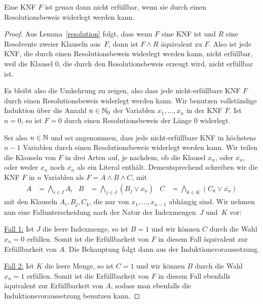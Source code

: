 \begin{thm}
	Eine KNF $F$ ist genau dann nicht erfüllbar, wenn sie durch einen Resolutionsbeweis widerlegt werden kann. 
\end{thm} 
\begin{proof}
	Aus Lemma~\ref{resolution} folgt, dass wenn $F$ eine KNF ist und $R$ eine Resolvente zweier Klauseln aus~$F$, dann ist $F \wedge R$ äquivalent zu $F$. Also ist jede KNF, die durch einen Resolutionsbeweis widerlegt werden kann, nicht erfüllbar, weil die Klausel $0$, die durch den Resolutionsbeweis erzeugt wird, nicht erfüllbar ist.  
	
	Es bleibt also die Umkehrung zu zeigen, also dass jede nicht-erfüllbare KNF $F$ durch einen Resolutionsbeweis widerlegt werden kann. Wir benutzen vollständige Induktion über die Anzahl $n \in \mathbb{N}_0$ der Variablen $x_1,\ldots,x_n$ in der KNF $F$. Ist $n=0$, so ist $F=0$ durch einen Resolutionsbeweis der Länge $0$ widerlegt. 
	
	Sei also $n \in \mathbb{N}$ und sei angenommen, dass jede nicht-erfüllbare KNF in höchstens $n-1$ Variablen durch einen Resolutionsbeweis widerlegt werden kann.	
	Wir teilen die Klauseln von $F$ in drei Arten auf, je nachdem, ob die Klausel $x_n$, oder $\overline{x_n}$, oder weder $x_n$ noch $\overline{x_n}$ als ein Literal enthält. Dementsprechend schreiben wir die KNF $F$ in $n$ Variablen als $F = A \wedge B \wedge C$, mit
	\begin{align*}
		A & = \bigwedge_{i \in I} A_i   & B & = \bigwedge_{j \in J} (B_j \vee x_n)  &  C & = \bigwedge_{k \in K} (C_k \vee \overline{x_n})
	\end{align*}
	mit den Klauseln $A_i, B_j, C_k$, die nur von $x_1,\ldots,x_{n-1}$ abhängig sind. Wir nehmen nun eine Fallunterscheidung nach der Natur der Indexmengen~$J$ und~$K$ vor:
	
	\underline{Fall 1:} Ist $J$ die leere Indexmenge, so ist $B=1$ und wir können $C$ durch die Wahl $x_n=0$ erfüllen. Somit ist die Erfüllbarkeit von $F$ in diesem Fall äquivalent zur Erfüllbarkeit von $A$. Die Behauptung folgt dann aus der Induktionsvoraussetzung.
	
	\underline{Fall 2:} Ist $K$ die leere Menge, so ist $C=1$ und wir können $B$ durch die Wahl $x_n=1$ erfüllen. Somit ist die Erfüllbarkeit von $F$ in diesem Fall ebenfalls äquivalent zur Erfüllbarkeit von $A$, sodass man ebenfalls die Induktionsvoraussetzung benutzen kann. 

\condclearpage
	

\end{proof}
